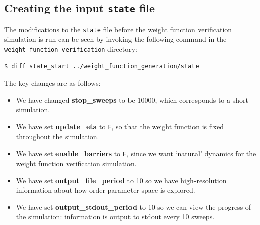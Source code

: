 \documentclass{report}
\begin{document}
\subsection{Creating the input \texttt{state} file}
The modifications to the \texttt{state} file before the weight function verification simulation is run can be seen by invoking the following command
in the \texttt{weight\_function\_verification} directory:
\begin{verbatim}
$ diff state_start ../weight_function_generation/state
\end{verbatim}
The key changes are as follows:
\begin{itemize}
\item We have changed \textbf{stop\_sweeps} to be 10000, which corresponds to a short simulation.
\item We have set \textbf{update\_eta} to \texttt{F}, so that the weight function is fixed throughout the simulation.
\item We have set \textbf{enable\_barriers} to \texttt{F}, since we want `natural' dynamics for the weight function verification simulation.
\item We have set \textbf{output\_file\_period} to 10 so we have high-resolution information about how order-parameter space is explored.
\item We have set \textbf{output\_stdout\_period} to 10 so we can view the progress of the simulation: information is output to stdout every 10 sweeps.
\end{itemize}
\end{document}
